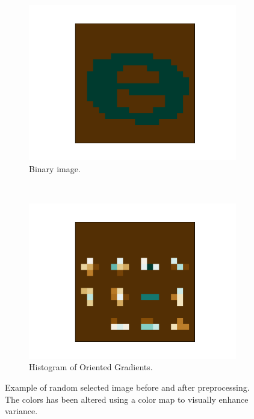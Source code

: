 \documentclass[../main.tex]{subfiles}
\begin{document}
\begin{figure}
    \begin{subfigure}[b]{0.48\textwidth}
        \includegraphics[width=\textwidth]{figures/pp/img_to_bool}
        \caption{Binary image.}
        \label{fig:bool}
    \end{subfigure}
        ~ %
    \begin{subfigure}[b]{0.48\textwidth}
        \includegraphics[width=\textwidth]{figures/pp/hog}
        \caption{Histogram of Oriented Gradients.}
        \label{fig:hog}
    \end{subfigure}
    \caption{Example of random selected image before and after preprocessing. The colors has been altered using a color map to visually enhance variance.}\label{fig:pp_image}
\end{figure}
\end{document}
